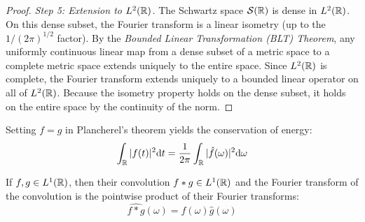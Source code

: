 \begin{proof}
\textit{Step 5: Extension to $L^2(\mathbb{R})$.}
The Schwartz space $\mathcal{S}(\mathbb{R})$ is dense in $L^2(\mathbb{R})$. On this dense subset, the Fourier transform is a linear isometry (up to the $1/(2\pi)^{1/2}$ factor). By the \textit{Bounded Linear Transformation (BLT) Theorem}, any uniformly continuous linear map from a dense subset of a metric space to a complete metric space extends uniquely to the entire space. Since $L^2(\mathbb{R})$ is complete, the Fourier transform extends uniquely to a bounded linear operator on all of $L^2(\mathbb{R})$. Because the isometry property holds on the dense subset, it holds on the entire space by the continuity of the norm.
\end{proof}

\begin{corollary}
Setting $f=g$ in Plancherel's theorem yields the conservation of energy:
\begin{equation}
\int_{\mathbb{R}} |f(t)|^2 \mathrm{d} t = \frac{1}{2\pi} \int_{\mathbb{R}} |\hat{f}(\omega)|^2 \mathrm{d} \omega
\end{equation}

\end{corollary}

\begin{theorem}
If $f, g \in L^1(\mathbb{R})$, then their convolution $f*g \in L^1(\mathbb{R})$ and the Fourier transform of the convolution is the pointwise product of their Fourier transforms:
\begin{equation}
\widehat{f*g}(\omega) = \hat{f}(\omega) \hat{g}(\omega)
\end{equation}

\end{theorem}

